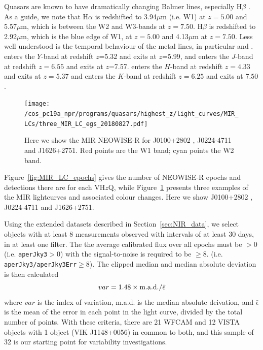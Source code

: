 \documentclass[usenatbib]{mnras}
\begin{document}
Quasars are known to have dramatically changing Balmer lines,
especially H$\beta$ \citep[e.g.,][]{LaMassa2015, Ruan2016, Runnoe2016,
Macleod2016, Gezari2017, Runco2016, YangQ2018, Assef2018, Stern2018,
Ross2018, MacLeod2019, Graham2019}. As a guide, we note that H$\alpha$
is redshifted to 3.94$\mu$m (i.e. W1) at $z=5.00$ and 5.57$\mu$m,
which is between the W2 and W3-bands at $z=7.50$.  H$\beta$ is
redshifted to 2.92$\mu$m, which is the blue edge of W1, at $z=5.00$
and 4.13$\mu$m at $z=7.50$. Less well understood is the temporal
behaviour of the metal lines, in particular \civ and \mgii.  \civ
enters the $Y$-band at redshift $z$=5.32 and exits at $z$=5.99, and
enters the $J$-band at redshift $z=6.55$ and exits at $z$=7.57. \mgii
enters the $H$-band at redshift $z=4.33$ and exits at $z=5.37$ and
enters the $K$-band at redshift $z=6.25$ and exits at $7.50$.


\begin{figure}
  \texttt{[image: /cos\_pc19a\_npr/programs/quasars/highest\_z/light\_curves/MIR\_LCs/three\_MIR\_LC\_egs\_20180827.pdf]}
  \centering
  \caption[]
  {Here we show the MIR NEOWISE-R for J0100+2802 \citep{Wu2015}, J0224-4711 and  J1626+2751. 
    Red points are the W1 band; cyan points the W2 band.} 
  \label{fig:MIR_LC_3egs}
\end{figure}
Figure~\ref{fig:MIR_LC_epochs} gives the number of NEOWISE-R epochs
and detections there are for each VH$z$Q, while
Figure~\ref{fig:MIR_LC_3egs} presents three examples of the MIR
lightcurves and associated colour changes. Here we show J0100+2802
\citep{Wu2015}, J0224-4711 and J1626+2751.

Using the extended datasets described in Section~\ref{sec:NIR_data},
we select objects with at least 8 measurements observed with intervals
of at least 30 days, in at least one filter. The the average
calibrated flux over all epochs must be $>0$ (i.e. {\tt aperJky3}$>0$)
with the signal-to-noise is required to be $\geq8$. (i.e. {\tt
aperJky3/aperJky3Err}$\geq$8). The clipped median and median absolute
deviation is then calculated
\begin{equation}
      var = 1.48 \times  {\rm m.a.d.} / \bar{\epsilon}
\end{equation}
where $var$ is the index of variation, m.a.d. is the median absolute
deivation, and $\bar{\epsilon}$ is the mean of the error in each point
in the light curve, divided by the total number of points.  With these
criteria, there are 21 WFCAM and 12 VISTA objects with 1 object (VIK
J1148+0056) in common to both, and this sample of 32 is our starting
point for variability investigations.
\end{document}
